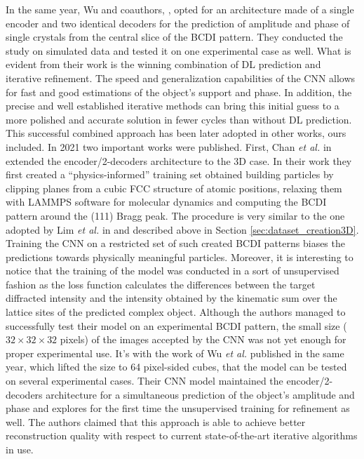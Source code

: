 In the same year, Wu and coauthors, \cite{Wu2021}, opted for an architecture made of a single encoder and two identical decoders for the prediction of 
amplitude and phase of single crystals from the central slice of the BCDI pattern. They conducted the study on simulated 
data and tested it on one experimental case as well. What is evident from their work is the winning combination of DL prediction
and iterative refinement. The speed and generalization capabilities of the CNN allows for fast and good estimations of the 
object's support and phase. In addition, the precise and well established iterative methods can bring this initial guess to a 
more polished and accurate solution in fewer cycles than without DL prediction. This successful combined approach has been 
later adopted in other works, ours included. In 2021 two important works were published. First, Chan \textit{et al.} in 
\cite{chan_rapid_2021} extended the encoder/2-decoders architecture to the 3D case. In their work they first created a 
``physics-informed'' training set obtained building particles by clipping planes from a cubic FCC structure of atomic 
positions, relaxing them with LAMMPS software for molecular dynamics and computing the BCDI pattern around the (111) Bragg 
peak. The procedure is very similar to the one adopted by Lim \textit{et al.} in \cite{lim_convolutional_2021} and described
above in Section \ref{sec:dataset_creation3D}. Training the CNN on a restricted set of such created BCDI patterns biases 
the predictions towards physically meaningful particles. Moreover, it is interesting to notice that the training of the model 
was conducted in a sort of unsupervised fashion as the loss function calculates the differences between the target diffracted
intensity and the intensity obtained by the kinematic sum over the lattice sites of the predicted complex object.
Although the authors managed to successfully test their model on
an experimental BCDI pattern, the small size ($32\times32\times32$ pixels) of the images accepted by the CNN was not yet 
enough for proper experimental use. It's with the work of Wu \textit{et al.} \cite{wu_three-dimensional_2021} published 
in the same year, which lifted the size to 64 pixel-sided cubes, that the model can be tested on several experimental cases. 
Their CNN model maintained the encoder/2-decoders architecture for a simultaneous prediction of the object's amplitude and phase 
and explores for the first time the unsupervised training for refinement as well. The authors claimed that this approach is 
able to achieve better reconstruction quality with respect to current state-of-the-art iterative algorithms in use. 

